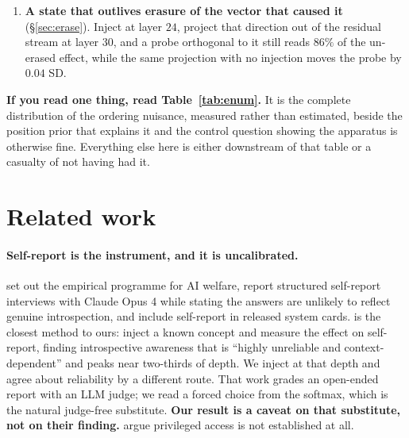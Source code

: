 \documentclass{article}
\begin{document}
\begin{enumerate}
\item \textbf{A state that outlives erasure of the vector that caused it} (\S\ref{sec:erase}).
Inject at layer $24$, project that direction out of the residual stream at layer $30$, and a probe
orthogonal to it still reads $86\%$ of the un-erased effect, while the same projection with no
injection moves the probe by $0.04$ SD.
\end{enumerate}

\noindent\textbf{If you read one thing, read Table~\ref{tab:enum}.} It is the complete distribution
of the ordering nuisance, measured rather than estimated, beside the position prior that explains it
and the control question showing the apparatus is otherwise fine. Everything else here is either
downstream of that table or a casualty of not having had it.

\section{Related work}
\label{sec:related}

\paragraph{Self-report is the instrument, and it is uncalibrated.} \citet{long2026} set out the
empirical programme for AI welfare, \citet{eleos2025} report structured self-report interviews with
Claude Opus 4 while stating the answers are unlikely to reflect genuine introspection, and
\citet{anthropic2025welfare} include self-report in released system cards. \citet{lindsey2026} is
the closest method to ours: inject a known concept and measure the effect on self-report, finding
introspective awareness that is ``highly unreliable and context-dependent'' and peaks near
two-thirds of depth. We inject at that depth and agree about reliability by a different route. That
work grades an open-ended report with an LLM judge; we read a forced choice from the softmax, which
is the natural judge-free substitute. \textbf{Our result is a caveat on that substitute, not on
their finding.} \citet{introspection_reality2026} argue privileged access is not established at all.
\end{document}
